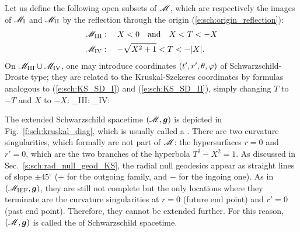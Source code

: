 Let us define the following open subsets of $\mathscr{M}$, which are respectively
the images of $\mathscr{M}_{\rm I}$ and $\mathscr{M}_{\rm II}$ by the reflection through the origin
(\ref{e:sch:origin_reflection}):
\begin{subequations}
\label{e:max:range_TX_M_III_IV}
\begin{align}
 & \mathscr{M}_{\rm III}: \quad X < 0 \quad\mbox{and}\quad X < T < -X \\
 & \mathscr{M}_{\rm IV}: \quad - \sqrt{X^2+1} < T < -|X| .
\end{align}
\end{subequations}
On $\mathscr{M}_{\rm III}\cup \mathscr{M}_{\rm IV}$, one may introduce coordinates
$(t',r',\theta,\varphi)$ of Schwarzschild-Droste type; they are related to
the Kruskal-Szekeres coordinates by formulas analogous to
(\ref{e:sch:KS_SD_I}) and (\ref{e:sch:KS_SD_II}), simply changing $T$ to $-T$
and $X$ to $-X$:
\be \label{e:sch:KS_SD_III}
    \M_{\rm III}: \quad {}
    \iff
\ee
\be \label{e:sch:KS_SD_IV}
    \M_{\rm IV}: \quad {}
    \iff
\ee

The extended Schwarzschild spacetime $(\mathscr{M},\bm{g})$ is depicted in
Fig.~\ref{f:sch:kruskal_diag}, which is usually called a
.
There are two curvature singularities, which formally are not part of $\mathscr{M}$:
the hypersurfaces $r=0$ and $r'=0$, which are the two branches of
the hyperbola $T^2 - X^2 = 1$.
As discussed in Sec.~\ref{s:sch:rad_null_geod_KS}, the radial null
geodesics appear as straight lines of slope $\pm 45^\circ$ ($+$ for the
outgoing family, and $-$ for the ingoing one).
As in $(\mathscr{M}_{\rm IEF},\bm{g})$, they are still not complete but the only
locations where they terminate are the curvature singularities
at $r=0$ (future end point) and $r'=0$ (past end point). Therefore, they cannot
be extended further. For this reason, $(\mathscr{M},\bm{g})$ is called the
of Schwarzschild spacetime.

